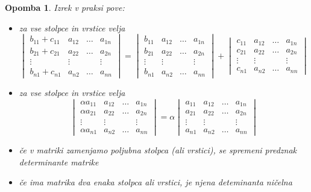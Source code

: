 \documentclass[10pt, a4paper]{article}
\newtheorem*{opomba}{Opomba}
\begin{document}
\begin{opomba}
    Izrek v praksi pove:
    \begin{itemize}
        \item za vse stolpce in vrstice velja $$\begin{vmatrix}
            b_{11} + c_{11} & a_{12} & \dots & a_{1n}\\
            b_{21} + c_{21} & a_{22} & \dots & a_{2n}\\
            \vdots & \vdots & & \vdots\\
            b_{n1} + c_{n1} & a_{n2} & \dots & a_{nn}
        \end{vmatrix} = \begin{vmatrix}
            b_{11} & a_{12} & \dots & a_{1n}\\
            b_{21} & a_{22} & \dots & a_{2n}\\
            \vdots & \vdots & & \vdots\\
            b_{n1} & a_{n2} & \dots & a_{nn}
        \end{vmatrix} + \begin{vmatrix}
            c_{11} & a_{12} & \dots & a_{1n}\\
            c_{21} & a_{22} & \dots & a_{2n}\\
            \vdots & \vdots & & \vdots\\
            c_{n1} & a_{n2} & \dots & a_{nn}
        \end{vmatrix}$$
        \item za vse stolpce in vrstice velja $$\begin{vmatrix}
            \alpha a_{11} & a_{12} & \dots & a_{1n}\\
            \alpha a_{21} & a_{22} & \dots & a_{2n}\\
            \vdots & \vdots & & \vdots\\
            \alpha a_{n1} & a_{n2} & \dots & a_{nn}
        \end{vmatrix} = \alpha \begin{vmatrix}
            a_{11} & a_{12} & \dots & a_{1n}\\
            a_{21} & a_{22} & \dots & a_{2n}\\
            \vdots & \vdots & & \vdots\\
            a_{n1} & a_{n2} & \dots & a_{nn}
        \end{vmatrix}$$
        \item če v matriki zamenjamo poljubna stolpca (ali vrstici), se spremeni predznak determinante matrike
        \item če ima matrika dva enaka stolpca ali vrstici, je njena deteminanta ničelna
    \end{itemize}
\end{opomba}
\end{document}
